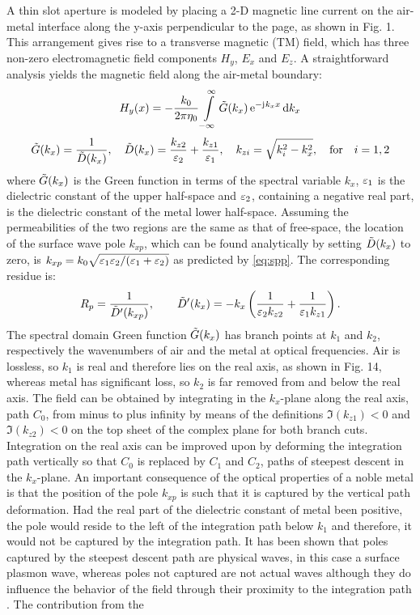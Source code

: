 \documentclass[11pt]{article}
\begin{document}
A thin slot aperture is modeled by placing a 2-D magnetic line current on the air-metal interface along the y-axis perpendicular to the page, as shown in Fig. 1. This arrangement gives rise to a transverse magnetic (TM) field, which has three non-zero electromagnetic field components $H_y$, $E_x$ and $E_z$. A straightforward analysis yields the magnetic field along the air-metal boundary:
%
\begin{equation}
  H_y(x) =  - \frac{k_0}{2 \pi \eta_0} \int\limits_{-\infty}^\infty  \tilde{G}(k_x) \, \mathrm{e}^{ - \mathrm{j}\mkern1mu k_x x} \mathop{}\!\mathrm{d} {k_x}
  \label{eq:Sommerfeld}
\end{equation}
%
\begin{equation}
  \tilde{G}(k_x) = \frac{1}{\tilde{D}(k_x)}, \quad
  \tilde{D}(k_x) = \frac{k_{z2}}{\varepsilon_2} + \frac{k_{z1}}{\varepsilon_1}, \quad
  k_{zi} = \sqrt{k_i^2 - k_x^2}, \quad \text{for} \quad i=1,2
  \label{eq:somm_details}
\end{equation}
%
where $\tilde{G}(k_x)$ is the Green function in terms of the spectral variable $k_x$, $\varepsilon_1$ is the dielectric constant of the upper half-space and $\varepsilon_2$, containing a negative real part, is the dielectric constant of the metal lower half-space. Assuming the permeabilities of the two regions are the same as that of free-space, the location of the surface wave pole $k_{xp}$, which can be found analytically by setting $\tilde{D}(k_x)$ to zero, is
$k_{xp} = k_0 \sqrt{ \varepsilon_1 \varepsilon_2 /{(\varepsilon_1 + \varepsilon_2)}}$ as predicted by \eqref{eq:spp}. The corresponding residue is:
%
\begin{equation}
  R_p = \frac{1}{\tilde{D}'(k_{xp})}, \qquad
  \tilde{D}'(k_x) =  -{k_x}\left( \frac{1}{\varepsilon_2 k_{z2}} + \frac{1}{\varepsilon_1 k_{z1}} \right).
  \label{eq:residue}
\end{equation}
%
The spectral domain Green function $\tilde{G}(k_x)$ has branch points at $k_1$ and  $k_2$, respectively the wavenumbers of air and the metal at optical frequencies. Air is lossless, so $k_1$ is real and therefore lies on the real axis, as shown in Fig. 14, whereas metal has significant loss, so $k_2$ is far removed from and below the real axis. The field can be obtained by integrating in the $k_x$-plane along the real axis, path $C_0$, from minus to
%
%
plus infinity by means of the definitions $\Im (k_{z1}) < 0$ and $\Im (k_{z2}) < 0$ on the top sheet of the complex plane for both branch cuts. Integration on the real axis can be improved upon by deforming the integration path vertically so that $C_0$ is replaced by $C_1$ and $C_2$, paths of steepest descent in the  $k_x$-plane. An important consequence of the optical properties of a noble metal is that the position of the pole $k_{xp}$ is such that it is captured by the vertical path deformation. Had the real part of the dielectric constant of metal been positive, the pole would reside to the left of the integration path below $k_1$ and therefore, it would not be captured by the integration path. It has been shown that poles captured by the steepest descent path are physical waves, in this case a surface plasmon wave, whereas poles not captured are not actual waves although they do influence the behavior of the field through their proximity to the integration path \cite{Collin2004}. The contribution from the
\end{document}
